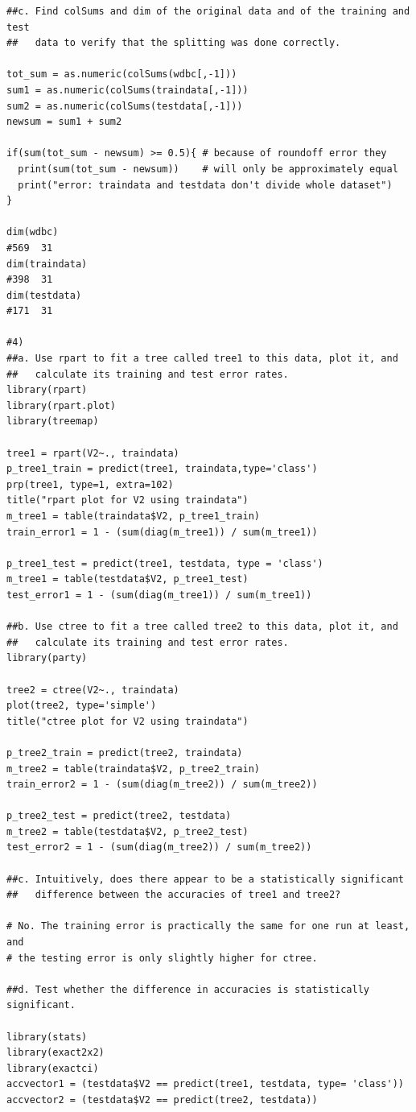 \documentclass[11pt]{article}
\begin{document}
\begin{Verbatim}
##c. Find colSums and dim of the original data and of the training and test 
##   data to verify that the splitting was done correctly.

tot_sum = as.numeric(colSums(wdbc[,-1]))
sum1 = as.numeric(colSums(traindata[,-1]))
sum2 = as.numeric(colSums(testdata[,-1]))
newsum = sum1 + sum2

if(sum(tot_sum - newsum) >= 0.5){ # because of roundoff error they
  print(sum(tot_sum - newsum))    # will only be approximately equal
  print("error: traindata and testdata don't divide whole dataset")
}

dim(wdbc)
#569  31
dim(traindata)
#398  31
dim(testdata)
#171  31

#4) 
##a. Use rpart to fit a tree called tree1 to this data, plot it, and 
##   calculate its training and test error rates.
library(rpart)
library(rpart.plot)
library(treemap)

tree1 = rpart(V2~., traindata)
p_tree1_train = predict(tree1, traindata,type='class')
prp(tree1, type=1, extra=102)
title("rpart plot for V2 using traindata")
m_tree1 = table(traindata$V2, p_tree1_train)
train_error1 = 1 - (sum(diag(m_tree1)) / sum(m_tree1))

p_tree1_test = predict(tree1, testdata, type = 'class')
m_tree1 = table(testdata$V2, p_tree1_test)
test_error1 = 1 - (sum(diag(m_tree1)) / sum(m_tree1))

##b. Use ctree to fit a tree called tree2 to this data, plot it, and 
##   calculate its training and test error rates.
library(party)

tree2 = ctree(V2~., traindata)
plot(tree2, type='simple')
title("ctree plot for V2 using traindata")

p_tree2_train = predict(tree2, traindata)
m_tree2 = table(traindata$V2, p_tree2_train)
train_error2 = 1 - (sum(diag(m_tree2)) / sum(m_tree2))

p_tree2_test = predict(tree2, testdata)
m_tree2 = table(testdata$V2, p_tree2_test)
test_error2 = 1 - (sum(diag(m_tree2)) / sum(m_tree2))

##c. Intuitively, does there appear to be a statistically significant 
##   difference between the accuracies of tree1 and tree2? 

# No. The training error is practically the same for one run at least, and 
# the testing error is only slightly higher for ctree. 

##d. Test whether the difference in accuracies is statistically significant. 

library(stats)
library(exact2x2)
library(exactci)
accvector1 = (testdata$V2 == predict(tree1, testdata, type= 'class'))
accvector2 = (testdata$V2 == predict(tree2, testdata))


\end{Verbatim}
\end{document}
